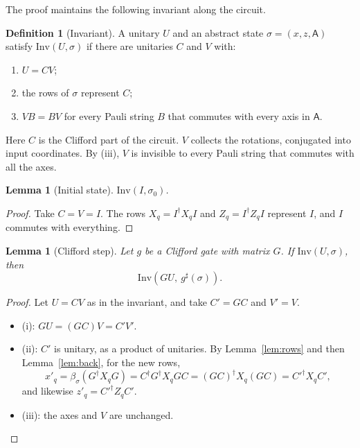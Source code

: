 \documentclass[11pt]{article}
\newtheorem{lemma}[theorem]{Lemma}
\theoremstyle{definition}
\newtheorem{definition}[theorem]{Definition}
\theoremstyle{remark}
\newcommand{\adj}{^{\dagger}}
\newcommand{\Ax}{\mathsf{A}}
\newcommand{\back}{\beta}
\begin{document}
The proof maintains the following invariant along the circuit.

\begin{definition}[Invariant]
A unitary $U$ and an abstract state $\sigma = (x, z, \Ax)$ satisfy $\mathrm{Inv}(U, \sigma)$
if there are unitaries $C$ and $V$ with:
\begin{enumerate}[label=(\roman*), nosep]
  \item $U = C V$;
  \item the rows of $\sigma$ represent $C$;
  \item $V B = B V$ for every Pauli string $B$ that commutes with every axis in $\Ax$.
\end{enumerate}
\end{definition}

Here $C$ is the Clifford part of the circuit. $V$ collects the rotations, conjugated into
input coordinates. By (iii), $V$ is invisible to every Pauli string that commutes with all
the axes.

\begin{lemma}[Initial state]\label{lem:inv-init}
$\mathrm{Inv}(I, \sigma_0)$.
\end{lemma}

\begin{proof}
Take $C = V = I$. The rows $X_q = I\adj X_q I$ and $Z_q = I\adj Z_q I$ represent $I$, and $I$
commutes with everything.
\end{proof}

\begin{lemma}[Clifford step]\label{lem:inv-clifford}
Let $g$ be a Clifford gate with matrix $G$. If $\mathrm{Inv}(U, \sigma)$, then
\[
  \mathrm{Inv}(G U,\ g^\sharp(\sigma)).
\]
\end{lemma}

\begin{proof}
Let $U = CV$ as in the invariant, and take $C' = G C$ and $V' = V$.
\begin{itemize}[nosep]
  \item (i): $G U = (G C) V = C' V'$.
  \item (ii): $C'$ is unitary, as a product of unitaries. By Lemma~\ref{lem:rows} and then
  Lemma~\ref{lem:back}, for the new rows,
  \[
    x'_q = \back_\sigma(G\adj X_q G) = C\adj G\adj X_q G C = (GC)\adj X_q (GC) = C'^{\dagger} X_q C',
  \]
  and likewise $z'_q = C'^{\dagger} Z_q C'$.
  \item (iii): the axes and $V$ are unchanged.\qedhere
\end{itemize}
\end{proof}
\end{document}
